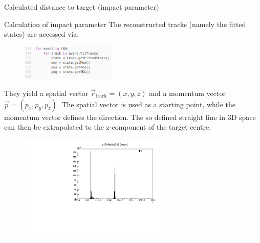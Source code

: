 \begin{frame}[t]
  \vspace*{\fill}
    \centering
    {\huge Calculated distance to target (impact parameter)}
  \vspace*{\fill}
\end{frame}


\begin{frame}[t]{Calculation of impact parameter}
    The reconstructed tracks (namely the fitted states) are accessed via:
    \begin{figure}
      \includegraphics[width=0.4\textwidth,left]{loop.png}
    \end{figure}
    They yield a spatial vector $\vec{r}_\text{track}=(x,y,z)$ and a momentum vector $\vec{p}=(p_x,p_y,p_z)$. The spatial vector is used as a starting point, while the momentum vector defines the direction. The so defined straight line in 3D space can then be extrapolated to the z-component of the target centre.
\end{frame}

\begin{frame}[t]{}
  \begin{figure}
    \centering
    \includegraphics[width=0.65\textwidth]{../hists/nofield/z_1M.pdf}
  \end{figure}
\end{frame}

